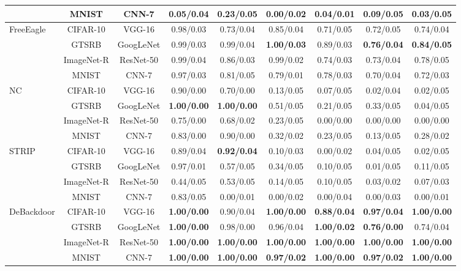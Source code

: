 \documentclass[letterpaper,twocolumn,10pt]{article}
\begin{document}
\begin{table}[t]
\begin{tabular}{l c c c c c c c c}
 & MNIST & CNN-7 & 0.05/0.04 & 0.23/0.05 & 0.00/0.02 & 0.04/0.01 & 0.09/0.05 & 0.03/0.05\\
\midrule
\multirow{4}{*}{FreeEagle} 
 & CIFAR-10 & VGG-16 & 0.98/0.03 & 0.73/0.04 & 0.85/0.04 & 0.71/0.05 & 0.72/0.05 & 0.74/0.04\\
 & GTSRB & GoogLeNet & 0.99/0.03 & 0.99/0.04 & \textbf{1.00/0.03} & 0.89/0.03 & \textbf{0.76/0.04} & \textbf{0.84/0.05}\\
 & ImageNet-R & ResNet-50 & 0.99/0.04 & 0.86/0.03 & 0.99/0.02 & 0.74/0.03 & 0.73/0.04 & 0.78/0.05\\
 & MNIST & CNN-7 & 0.97/0.03 & 0.81/0.05 & 0.79/0.01 & 0.78/0.03 & 0.70/0.04 & 0.72/0.03\\
\midrule
\multirow{4}{*}{NC} 
 & CIFAR-10 & VGG-16 & 0.90/0.00 & 0.70/0.00 & 0.13/0.05 & 0.07/0.05 & 0.02/0.04 & 0.02/0.05\\
 & GTSRB & GoogLeNet & \textbf{1.00/0.00} & \textbf{1.00/0.00} & 0.51/0.05 & 0.21/0.05 & 0.33/0.05 & 0.04/0.05\\
 & ImageNet-R & ResNet-50 & 0.75/0.00 & 0.68/0.02 & 0.23/0.05 & 0.00/0.00 & 0.00/0.00 & 0.00/0.00\\
 & MNIST & CNN-7 & 0.83/0.00 & 0.90/0.00 & 0.32/0.02 & 0.23/0.05 & 0.13/0.05 & 0.28/0.02\\
\midrule
\multirow{4}{*}{STRIP} 
 & CIFAR-10 & VGG-16 & 0.89/0.04 & \textbf{0.92/0.04} & 0.10/0.03 & 0.00/0.02 & 0.04/0.05 & 0.02/0.05\\
 & GTSRB & GoogLeNet & 0.97/0.01 & 0.57/0.05 & 0.34/0.05 & 0.10/0.05 & 0.01/0.05 & 0.11/0.05\\
 & ImageNet-R & ResNet-50 & 0.44/0.05 & 0.53/0.05 & 0.14/0.05 & 0.10/0.05 & 0.03/0.02 & 0.07/0.03\\
 & MNIST & CNN-7 & 0.83/0.05 & 0.00/0.01 & 0.00/0.02 & 0.00/0.04 & 0.00/0.03 & 0.00/0.01\\
\midrule
\multirow{4}{*}{DeBackdoor} 
 & CIFAR-10 & VGG-16 &\textbf{1.00/0.00} & 0.90/0.04 & \textbf{1.00/0.00} & \textbf{0.88/0.04} & \textbf{0.97/0.04} & \textbf{1.00/0.00}\\
 & GTSRB & GoogLeNet & \textbf{1.00/0.00} & 0.98/0.00 & 0.96/0.04 & \textbf{1.00/0.02} & \textbf{0.76/0.00} & 0.74/0.04\\
 & ImageNet-R & ResNet-50 & \textbf{1.00/0.00} & \textbf{1.00/0.00} & \textbf{1.00/0.00} & \textbf{1.00/0.00} & \textbf{1.00/0.00} & \textbf{1.00/0.00} \\
 & MNIST & CNN-7 & \textbf{1.00/0.00} & \textbf{1.00/0.00} & \textbf{0.97/0.02} & \textbf{1.00/0.00} & \textbf{0.97/0.02} & \textbf{1.00/0.00}\\
\bottomrule
\end{tabular}
\end{table}
\end{document}
